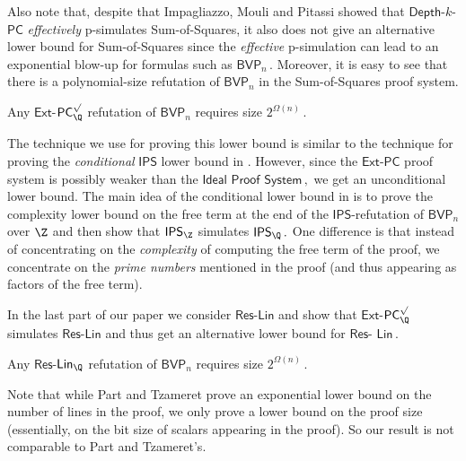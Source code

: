 \documentclass{toc}
\begin{document}
Also note that, despite that Impagliazzo, Mouli and Pitassi \cite{IMP19_new} showed that $\mathsf{Depth}$-$k$-$\mathsf{PC}$ \textit{effectively} p-simulates Sum-of-Squares, it also does not give an alternative lower bound for  Sum-of-Squares since the \textit{effective} p-simulation can lead to an exponential blow-up for formulas such as %
$\mathsf{BVP}_n\,.$ %
 Moreover, it is easy to see that there is a polynomial-size refutation of $\mathsf{BVP}_n$ in the Sum-of-Squares proof system.

\begin{theorem}
Any $\mathsf{Ext}$-$\mathsf{PC}_{\Q}^{\surd}$ refutation of $\mathsf{BVP}_n$  requires size %
$2^{\Omega(n)}\,.$ %
\end{theorem}

The technique we use for proving this lower bound is similar to the technique for proving the \textit{conditional} $\mathsf{IPS}$ lower bound in \cite{AGHT19_new}.
However, since
the  %
$\mathsf{Ext}$-$\mathsf{PC}$ proof system is possibly weaker than the $\mathsf{Ideal}$ $\mathsf{Proof}$ %
$\mathsf{System}\,,$ %
we get an unconditional lower bound. The main idea of the conditional lower bound in \cite{AGHT19_new} is to prove the complexity lower bound on the free term %
at  %
the end of the $\mathsf{IPS}$-refutation of $\mathsf{BVP}_n$ over $\Z$ and then show that $\mathsf{IPS}_\Z$ simulates %
$\mathsf{IPS}_{\Q}\,.$ %
One difference is that instead of concentrating on the \emph{complexity} of computing the free term of the proof, we concentrate on the \emph{prime numbers}
%
mentioned in the proof (and thus appearing as factors of the free term).

%
In the last part of our paper  %
%
we consider $\mathsf{Res}$-$\mathsf{Lin}$ and show that $\mathsf{Ext}$-$\mathsf{PC}_{\Q}^{\surd}$ simulates $\mathsf{Res}$-$\mathsf{Lin}$ 
and thus get an alternative lower bound for $\mathsf{Res}$-%
$\mathsf{Lin}\,.$ %

\begin{corollary}
Any $\mathsf{Res}$-$\mathsf{Lin}_{\Q}$ refutation of $\mathsf{BVP}_n$ requires size %
$2^{\Omega(n)}\,.$ %
\end{corollary}

Note that while Part and Tzameret \cite{PT18_new} prove an exponential lower bound on the number of lines in the proof, we %
%
only prove a lower bound %
on the proof size (essentially, on the bit size of scalars appearing in the proof). 
%
%
%
%
So our result is not comparable to Part and Tzameret's.  %
%
\end{document}
